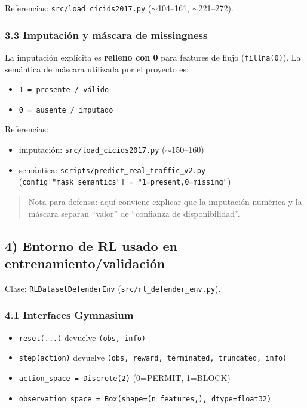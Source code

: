 ﻿\documentclass[12pt,a4paper]{article}
\begin{document}
Referencias: \verb|src/load_cicids2017.py| ($\sim$104--161, $\sim$221--272).

\subsubsection{3.3 Imputación y máscara de missingness}

La imputación explícita es \textbf{relleno con 0} para features de flujo (\texttt{fillna(0)}).
La semántica de máscara utilizada por el proyecto es:

\begin{itemize}
  \item \texttt{1 = presente / válido}
  \item \texttt{0 = ausente / imputado}
\end{itemize}

Referencias:

\begin{itemize}
  \item imputación: \verb|src/load_cicids2017.py| ($\sim$150--160)
  \item semántica: \verb|scripts/predict_real_traffic_v2.py|
        (\texttt{config["mask\_semantics"] = "1=present,0=missing"})
\end{itemize}

\begin{quote}
Nota para defensa: aquí conviene explicar que la imputación numérica y la máscara separan ``valor''
de ``confianza de disponibilidad''.
\end{quote}

\subsection{4) Entorno de RL usado en entrenamiento/validación}

Clase: \texttt{RLDatasetDefenderEnv} (\verb|src/rl_defender_env.py|).

\subsubsection{4.1 Interfaces Gymnasium}

\begin{itemize}
  \item \texttt{reset(...)} devuelve \texttt{(obs, info)}
  \item \texttt{step(action)} devuelve \texttt{(obs, reward, terminated, truncated, info)}
  \item \texttt{action\_space = Discrete(2)} (0=PERMIT, 1=BLOCK)
  \item \texttt{observation\_space = Box(shape=(n\_features,), dtype=float32)}
\end{itemize}
\end{document}
